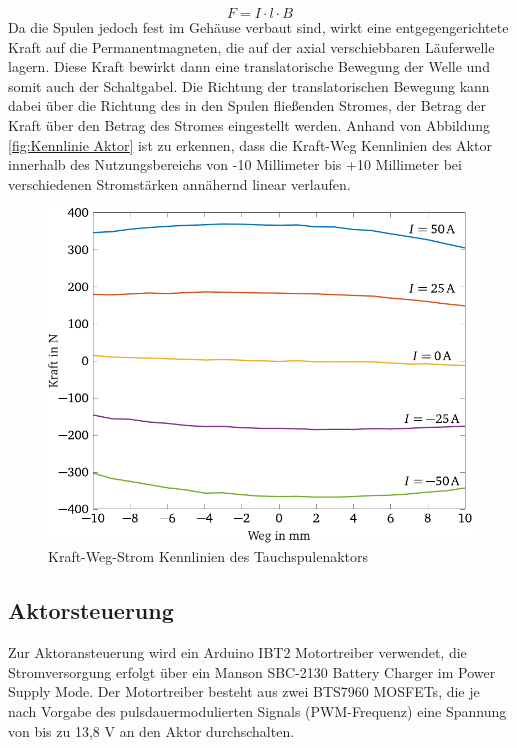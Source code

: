 \begin{equation}\label{eq:lorentz}
F=I\cdot l\cdot B
\end{equation}
Da die Spulen jedoch fest im Gehäuse verbaut sind, wirkt eine entgegengerichtete Kraft auf die Permanentmagneten, die auf der axial verschiebbaren Läuferwelle lagern. Diese Kraft bewirkt dann eine translatorische Bewegung der Welle und somit auch der Schaltgabel. Die Richtung der translatorischen Bewegung kann dabei über die Richtung des in den Spulen fließenden Stromes, der Betrag der Kraft über den Betrag des Stromes eingestellt werden.
Anhand von Abbildung \autoref{fig:Kennlinie Aktor} ist zu erkennen, dass die Kraft-Weg Kennlinien des Aktor innerhalb des Nutzungsbereichs von -10 Millimeter bis +10 Millimeter bei verschiedenen Stromstärken annähernd linear verlaufen. 

\begin{figure}[h]
	\centering
		\includegraphics{Bilder/KennlinieAktor.pdf}
	\caption{Kraft-Weg-Strom Kennlinien des Tauchspulenaktors \cite[S.12]{adp}}
	\label{fig:Kennlinie Aktor}
\end{figure} \noindent

\subsection{Aktorsteuerung}

Zur Aktoransteuerung wird ein Arduino IBT2 Motortreiber verwendet, die Stromversorgung erfolgt über ein Manson SBC-2130 Battery Charger im Power Supply Mode. Der Motortreiber besteht aus zwei BTS7960 MOSFETs, die je nach Vorgabe des pulsdauermodulierten Signals (PWM-Frequenz) eine Spannung von bis zu 13,8 V an den Aktor durchschalten. 

